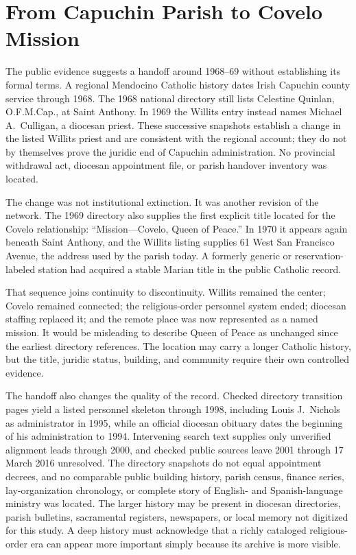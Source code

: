 \section{From Capuchin Parish to Covelo Mission}

The public evidence suggests a handoff around 1968--69 without establishing its formal terms. A regional Mendocino Catholic history dates Irish Capuchin county service through 1968. The 1968 national directory still lists Celestine Quinlan, O.F.M.Cap., at Saint Anthony. In 1969 the Willits entry instead names Michael A.~Culligan, a diocesan priest. These successive snapshots establish a change in the listed Willits priest and are consistent with the regional account; they do not by themselves prove the juridic end of Capuchin administration. No provincial withdrawal act, diocesan appointment file, or parish handover inventory was located.

The change was not institutional extinction. It was another revision of the network. The 1969 directory also supplies the first explicit title located for the Covelo relationship: ``Mission---Covelo, Queen of Peace.'' In 1970 it appears again beneath Saint Anthony, and the Willits listing supplies 61 West San Francisco Avenue, the address used by the parish today. A formerly generic or reservation-labeled station had acquired a stable Marian title in the public Catholic record.

That sequence joins continuity to discontinuity. Willits remained the center; Covelo remained connected; the religious-order personnel system ended; diocesan staffing replaced it; and the remote place was now represented as a named mission. It would be misleading to describe Queen of Peace as unchanged since the earliest directory references. The location may carry a longer Catholic history, but the title, juridic status, building, and community require their own controlled evidence.

The handoff also changes the quality of the record. Checked directory transition pages yield a listed personnel skeleton through 1998, including Louis J.~Nichols as administrator in 1995, while an official diocesan obituary dates the beginning of his administration to 1994. Intervening search text supplies only unverified alignment leads through 2000, and checked public sources leave 2001 through 17 March 2016 unresolved. The directory snapshots do not equal appointment decrees, and no comparable public building history, parish census, finance series, lay-organization chronology, or complete story of English- and Spanish-language ministry was located. The larger history may be present in diocesan directories, parish bulletins, sacramental registers, newspapers, or local memory not digitized for this study. A deep history must acknowledge that a richly cataloged religious-order era can appear more important simply because its archive is more visible.

